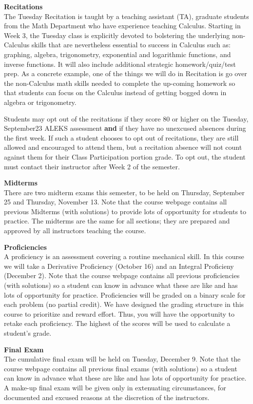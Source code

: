 \documentclass[12pt]{article}
\renewcommand{\emph}[1]{\textsf{\textbf{#1}}}
\newcommand{\localhead}[1]{\par\smallskip\textbf{#1}\nobreak\\}%
\def\heading#1{\localhead{\large\emph{#1}}}
\begin{document}
\heading{Recitations}
The Tuesday Recitation is taught by a teaching assistant (TA), graduate students from the Math  Department who have experience teaching Calculus. Starting in Week 3, the Tuesday class is explicitly devoted to bolstering the underlying non-Calculus skills that are nevertheless essential to success in Calculus such as: graphing, algebra, trigonometry, exponential and logarithmic functions, and inverse functions. It will also include additional strategic homework/quiz/test prep. As a concrete example, one of the things we will do in Recitation is go over the non-Calculus math skills needed to complete the up-coming homework so that students can focus on the Calculus instead of getting bogged down in algebra or trigonometry.

Students may opt out of the recitations if they score 80 or higher on the Tuesday, September23 ALEKS assessment \textbf{and} if they have no unexcused absences during the first week. If such a student chooses to opt out of recitations, they are still allowed and encouraged to attend them, but a recitation absence will not count against them for their Class Participation portion grade. To opt out, the student must contact their instructor after Week 2 of the semester.

\heading{Midterms}
There are two midterm exams this semester, to be held on Thursday, September 25 and Thursday, November 13. Note that the course webpage contains all previous Midterms (with solutions) to provide lots of opportunity for students to practice. The midterms are the same 
for all sections; they are prepared and approved by all instructors teaching the course. 

\heading{Proficiencies}
A proficiency is an assessment covering a routine mechanical skill.  In this course we will take a Derivative Proficiency (October 16) and an Integral Proficieny (December 2). Note that the course webpage contains all previous proficiencies (with solutions) so a student can know in advance what these are like and has lots of opportunity for practice. Proficiencies will be graded on a binary scale for each problem (no partial credit). We have designed the grading structure in this course to prioritize and reward effort. Thus, you will have the opportunity to retake each proficiency. The highest of the scores will be used to calculate a student's grade.

\pagebreak

\heading{Final Exam} 
The cumulative final exam will be held on Tuesday, December 9. Note that the course webpage contains all previous final exams (with solutions) so a student can know in advance what these are like  and has lots of opportunity for practice. A make-up final exam will be given only in extenuating circumstances, for documented and excused reasons at the discretion of the instructors.
\end{document}

